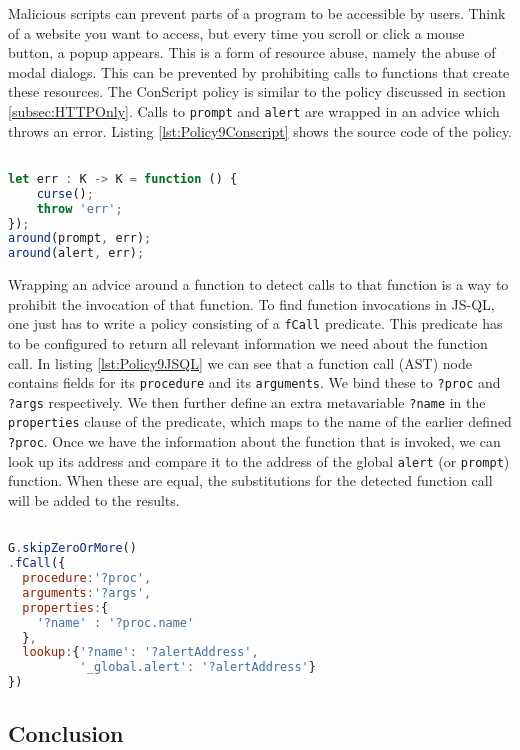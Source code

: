 Malicious scripts can prevent parts of a program to be accessible by users. Think of a website you want to access, but every time you scroll or click a mouse button, a popup appears. This is a form of resource abuse, namely the abuse of modal dialogs. This can be prevented by prohibiting calls to functions that create these resources. The ConScript policy is similar to the policy discussed in section \ref{subsec:HTTPOnly}. Calls to \texttt{prompt} and \texttt{alert} are wrapped in an advice which throws an error. Listing \ref{lst:Policy9Conscript} shows the source code of the policy.

\begin{lstlisting}[label={lst:Policy9Conscript},language=JavaScript,caption=Policy 9 in ConScript,mathescape=true]  % float=t?

let err : K -> K = function () { 
    curse(); 
    throw 'err'; 
}); 
around(prompt, err); 
around(alert, err);
\end{lstlisting}

Wrapping an advice around a function to detect calls to that function is a way to prohibit the invocation of that function. To find function invocations in JS-QL, one just has to write a policy consisting of a \texttt{fCall} predicate. This predicate has to be configured to return all relevant information we need about the function call. In listing \ref{lst:Policy9JSQL} we can see that a function call (AST) node contains fields for its \texttt{procedure} and its \texttt{arguments}. We bind these to \texttt{?proc} and \texttt{?args} respectively. We then further define an extra metavariable \texttt{?name} in the \texttt{properties} clause of the predicate, which maps to the name of the earlier defined \texttt{?proc}. Once we have the information about the function that is invoked, we can look up its address and compare it to the address of the global \texttt{alert} (or \texttt{prompt}) function. When these are equal, the substitutions for the detected function call will be added to the results.

\begin{lstlisting}[label={lst:Policy9JSQL},language=JavaScript,caption=Policy 9 in JS-QL,mathescape=true]  % float=t?

G.skipZeroOrMore()
.fCall({
  procedure:'?proc',
  arguments:'?args',
  properties:{
    '?name' : '?proc.name'
  },
  lookup:{'?name': '?alertAddress',
          '_global.alert': '?alertAddress'}
})
\end{lstlisting}

\subsection{Conclusion}

